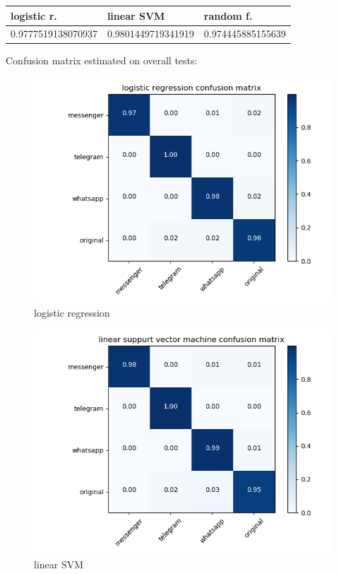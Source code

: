  {\def\arraystretch{1.3} 
 \begin{table}[H] 
\centering 
\begin{tabular}{|l|l|l|} 
\hline 
logistic r.  &linear SVM  &random f.  \\ \hline
0.9777519138070937  &0.9801449719341919  &0.974445885155639  \\ \hline
\end{tabular} 
\end{table} }
Confusion matrix estimated on overall tests: 

 \begin{figure}[H] 
\centering 
\includegraphics[scale=.6]{images/new_met_logistic_total.png} 
\caption{logistic regression} 
\end{figure} 

 \begin{figure}[H] 
\centering 
\includegraphics[scale=.6]{images/new_met_lsvm_total.png} 
\caption{linear SVM} 
\end{figure} 

